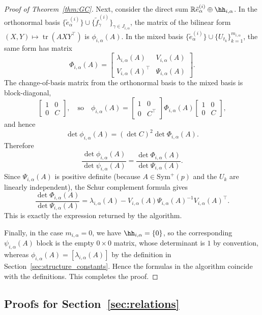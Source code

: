 \documentclass[12pt]{amsart}
\theoremstyle{plain}
\theoremstyle{definition}
\theoremstyle{remark}
\newcommand{\R}{\mathbb{R}}
\newcommand{\1}{\mathbf{1}}
\newcommand{\tr}{\operatorname{tr}}
\begin{document}
\begin{proof}[Proof of Theorem~\ref{thm:GC}]
Next, consider the direct sum
$\R\tilde e^{(i)}_\alpha \oplus \hh_{i,\alpha}$.
In the orthonormal basis
$\{\tilde e^{(i)}_\alpha\}\cup\{\tilde f_\gamma^{(i)}\}_{\gamma\in J_{i,\alpha}}$,
the matrix of the bilinear form
$(X,Y)\mapsto \tr(AXY^\top)$ is $\phi_{i,\alpha}(A)$.
In the mixed basis
$\{\tilde e^{(i)}_\alpha\}\cup\{U_{t_k}\}_{k=1}^{m_{i,\alpha}}$,
the same form has matrix
\[
  \Phi_{i,\alpha}(A)
  =
  \begin{bmatrix}
    \lambda_{i,\alpha}(A) & V_{i,\alpha}(A) \\
    V_{i,\alpha}(A)^\top & \Psi_{i,\alpha}(A)
  \end{bmatrix}.
\]
The change-of-basis matrix from the orthonormal basis to the mixed basis
is block-diagonal,
\[
  \begin{bmatrix}
    1 & 0\\ 0 & C
  \end{bmatrix},\quad\mbox{so}\quad 
  \phi_{i,\alpha}(A)
  =
  \begin{bmatrix}
    1 & 0\\ 0 & C^\top
  \end{bmatrix}
  \Phi_{i,\alpha}(A)
  \begin{bmatrix}
    1 & 0\\ 0 & C
  \end{bmatrix},
\]
and hence
\[
  \det\phi_{i,\alpha}(A)
  = (\det C)^2 \det\Phi_{i,\alpha}(A).
\]
Therefore
\[
  \frac{\det\phi_{i,\alpha}(A)}{\det\psi_{i,\alpha}(A)}
  = \frac{\det\Phi_{i,\alpha}(A)}{\det\Psi_{i,\alpha}(A)}.
\]
Since $\Psi_{i,\alpha}(A)$ is positive definite (because $A\in\mathrm{Sym}^+(p)$
and the $U_k$ are linearly independent), the Schur complement formula gives
\[
  \frac{\det\Phi_{i,\alpha}(A)}{\det\Psi_{i,\alpha}(A)}
  = \lambda_{i,\alpha}(A)
    - V_{i,\alpha}(A) \Psi_{i,\alpha}(A)^{-1} V_{i,\alpha}(A)^\top.
\]
This is exactly the expression returned by the algorithm.

Finally, in the case $m_{i,\alpha}=0$, we have $\hh_{i,\alpha}=\{0\}$,
so the corresponding $\psi_{i,\alpha}(A)$ block is the empty $0\times 0$
matrix, whose determinant is $1$ by convention, whereas
$\phi_{i,\alpha}(A)=[\lambda_{i,\alpha}(A)]$ by the definition in
Section~\ref{sec:structure_constants}. Hence the formulas in the algorithm
coincide with the definitions. This completes the proof.
\end{proof}


\subsection{Proofs for Section~\ref{sec:relations}}
\end{document}
